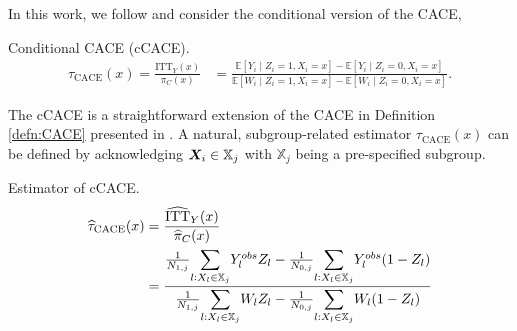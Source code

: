 In this work, we follow \cite{bargagli-stoffi_heterogeneous_2022} and consider the conditional version of the CACE, 

\begin{defn}{Conditional CACE (cCACE).}
   \begin{align*}
      \tau_{\text{CACE}}(x) = \frac{\text{ITT}_{Y}(x)}{\pi_C(x)} &= \frac{\mathbb{E}[Y_i \mid Z_i = 1, X_i = x] - \mathbb{E}[Y_i \mid Z_i = 0, X_i = x]}{\mathbb{E}[W_i \mid Z_i = 1, X_i = x] - \mathbb{E}[W_i \mid Z_i = 0, X_i = x]}.
   \end{align*}
\end{defn}

The cCACE is a straightforward extension of the CACE in Definition \ref{defn:CACE} presented in \cite{bargagli-stoffi_heterogeneous_2022}. A natural, subgroup-related estimator $\tau_{\text{CACE}}(x)$ can be defined by acknowledging $\bm X_i \in \mathbb{X}_j$ with $\mathbb{X}_j$ being a pre-specified subgroup.

\begin{defn}{Estimator of cCACE.}
   \label{defn:cCACE_estimator}
   \begin{align*}
      \widehat\tau_{\text{CACE}}(x) &= \frac{\widehat{\text{ITT}}_{Y}(x)}{\widehat{\pi}_C(x)} \\
      &= \frac{\frac{1}{N_{1,j}} \mathlarger{\sum}_{l: X_l \in \mathbb{X}_j} Y^{obs}_l Z_l - \frac{1}{N_{0,j}} \mathlarger{\sum}_{l: X_l \in \mathbb{X}_j} Y^{obs}_l (1 - Z_l)}{\frac{1}{N_{1,j}} \mathlarger{\sum}_{l: X_l \in \mathbb{X}_j} W_l Z_l - \frac{1}{N_{0,j}} \mathlarger{\sum}_{l: X_l \in \mathbb{X}_j} W_l (1 - Z_l)
      }\\
   \end{align*}
\end{defn}

